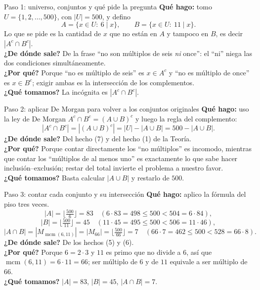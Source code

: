 \documentclass[11pt]{article}
\begin{document}
\begin{sol}

\begin{paso}{Paso 1: universo, conjuntos y qu\'e pide la pregunta}
\textbf{Qu\'e hago:} tomo $U=\{1,2,\dots,500\}$, con $|U|=500$, y defino
\[
A=\{x\in U:\ 6\mid x\},\qquad B=\{x\in U:\ 11\mid x\}.
\]
Lo que se pide es la cantidad de $x$ que no est\'an en $A$ y tampoco en $B$, es decir $|A^{c}\cap B^{c}|$.\\
\textbf{¿De d\'onde sale?} De la frase ``no son m\'ultiplos de seis \emph{ni} once'': el ``ni'' niega las dos condiciones simult\'aneamente.\\
\textbf{¿Por qu\'e?} Porque ``no es m\'ultiplo de seis'' es $x\in A^{c}$ y ``no es m\'ultiplo de once'' es $x\in B^{c}$; exigir ambas es la intersecci\'on de los complementos.\\
\textbf{¿Qu\'e tomamos?} La inc\'ognita es $|A^{c}\cap B^{c}|$.
\end{paso}

\begin{paso}{Paso 2: aplicar De Morgan para volver a los conjuntos originales}
\textbf{Qu\'e hago:} uso la ley de De Morgan $A^{c}\cap B^{c} = (A\cup B)^{c}$ y luego la regla del complemento:
\[
|A^{c}\cap B^{c}| = |(A\cup B)^{c}| = |U| - |A\cup B| = 500 - |A\cup B| .
\]
\textbf{¿De d\'onde sale?} Del hecho (7) y del hecho (1) de la Teor\'ia.\\
\textbf{¿Por qu\'e?} Porque contar directamente los ``no m\'ultiplos'' es incomodo, mientras que contar los ``m\'ultiplos de al menos uno'' es exactamente lo que sabe hacer inclusi\'on--exclusi\'on; restar del total invierte el problema a nuestro favor.\\
\textbf{¿Qu\'e tomamos?} Basta calcular $|A\cup B|$ y restarlo de $500$.
\end{paso}

\begin{paso}{Paso 3: contar cada conjunto y su intersecci\'on}
\textbf{Qu\'e hago:} aplico la f\'ormula del piso tres veces.
\[
|A| = \Big\lfloor \tfrac{500}{6}\Big\rfloor = 83 \quad (6\cdot 83 = 498 \le 500 < 504 = 6\cdot 84),
\]
\[
|B| = \Big\lfloor \tfrac{500}{11}\Big\rfloor = 45 \quad (11\cdot 45 = 495 \le 500 < 506 = 11\cdot 46),
\]
\[
|A\cap B| = |M_{\operatorname{mcm}(6,11)}| = |M_{66}| = \Big\lfloor \tfrac{500}{66}\Big\rfloor = 7 \quad (66\cdot 7 = 462 \le 500 < 528 = 66\cdot 8).
\]
\textbf{¿De d\'onde sale?} De los hechos (5) y (6).\\
\textbf{¿Por qu\'e?} Porque $6=2\cdot 3$ y $11$ es primo que no divide a $6$, as\'i que $\operatorname{mcm}(6,11)=6\cdot 11=66$; ser m\'ultiplo de $6$ y de $11$ equivale a ser m\'ultiplo de $66$.\\
\textbf{¿Qu\'e tomamos?} $|A|=83$, $|B|=45$, $|A\cap B|=7$.
\end{paso}


\end{sol}
\end{document}
